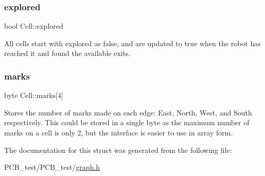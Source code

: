 \subsubsection{\texorpdfstring{explored}{explored}}
{\footnotesize\ttfamily bool Cell\+::explored}

All cells start with explored as \textquotesingle{}false\textquotesingle{}, and are updated to \textquotesingle{}true\textquotesingle{} when the robot has reached it and found the available exits. \mbox{\label{structCell_aba96fc4db8247038613b0bc8be936db9}} 
\subsubsection{\texorpdfstring{marks}{marks}}
{\footnotesize\ttfamily byte Cell\+::marks\mbox{[}4\mbox{]}}

Stores the number of marks made on each edge\+: \textquotesingle{}East\textquotesingle{}, \textquotesingle{}North\textquotesingle{}, \textquotesingle{}West\textquotesingle{}, and \textquotesingle{}South\textquotesingle{} respectively. This could be stored in a single byte as the maximum number of marks on a cell is only 2, but the interface is easier to use in array form. 

The documentation for this struct was generated from the following file\+:\begin{DoxyCompactItemize}
\item 
P\+C\+B\+\_\+test/\+P\+C\+B\+\_\+test/\hyperlink{graph_8h}{graph.\+h}\end{DoxyCompactItemize}
